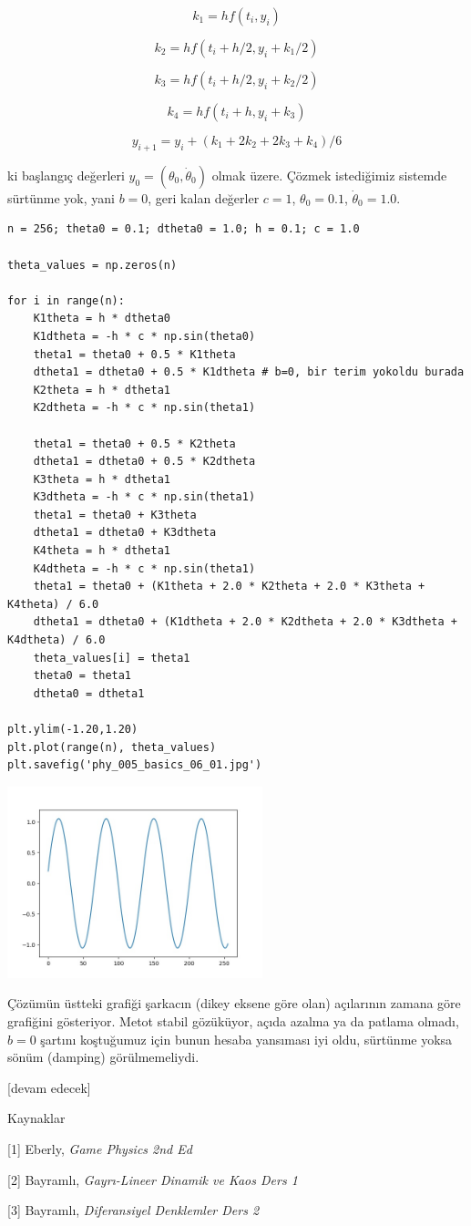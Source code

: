 \documentclass[12pt,fleqn]{article}\usepackage{../../common}
\begin{document}
$$
k_1 = h f(t_i, y_i)
$$

$$
k_2 = h f(t_i + h/2, y_i + k_1/2)
$$

$$
k_3 = h f(t_i + h/2, y_i + k_2/2)
$$

$$
k_4 = h f(t_i + h, y_i + k_3)
$$

$$
y_{i+1} = y_i + (k_1 + 2 k_2 + 2 k_3 + k_4) / 6
$$

ki başlangıç değerleri $y_0 = (\theta_0,\dot{\theta}_0)$ olmak üzere. Çözmek
istediğimiz sistemde sürtünme yok, yani $b=0$, geri kalan değerler $c=1$,
$\theta_0=0.1$, $\dot{\theta}_0 = 1.0$.


\begin{verbatim}
n = 256; theta0 = 0.1; dtheta0 = 1.0; h = 0.1; c = 1.0

theta_values = np.zeros(n)

for i in range(n):
    K1theta = h * dtheta0
    K1dtheta = -h * c * np.sin(theta0)
    theta1 = theta0 + 0.5 * K1theta
    dtheta1 = dtheta0 + 0.5 * K1dtheta # b=0, bir terim yokoldu burada
    K2theta = h * dtheta1
    K2dtheta = -h * c * np.sin(theta1)

    theta1 = theta0 + 0.5 * K2theta
    dtheta1 = dtheta0 + 0.5 * K2dtheta
    K3theta = h * dtheta1
    K3dtheta = -h * c * np.sin(theta1)
    theta1 = theta0 + K3theta
    dtheta1 = dtheta0 + K3dtheta
    K4theta = h * dtheta1
    K4dtheta = -h * c * np.sin(theta1)
    theta1 = theta0 + (K1theta + 2.0 * K2theta + 2.0 * K3theta + K4theta) / 6.0
    dtheta1 = dtheta0 + (K1dtheta + 2.0 * K2dtheta + 2.0 * K3dtheta + K4dtheta) / 6.0
    theta_values[i] = theta1
    theta0 = theta1
    dtheta0 = dtheta1

plt.ylim(-1.20,1.20)
plt.plot(range(n), theta_values)
plt.savefig('phy_005_basics_06_01.jpg')
\end{verbatim}

\includegraphics[width=20em]{phy_005_basics_06_01.jpg}

Çözümün üstteki grafiği şarkacın (dikey eksene göre olan) açılarının zamana göre
grafiğini gösteriyor. Metot stabil gözüküyor, açıda azalma ya da patlama olmadı,
$b=0$ şartını koştuğumuz için bunun hesaba yansıması iyi oldu, sürtünme yoksa
sönüm (damping) görülmemeliydi. 










[devam edecek]

Kaynaklar

[1] Eberly, {\em Game Physics 2nd Ed}

[2] Bayramlı, {\em Gayrı-Lineer Dinamik ve Kaos Ders 1}

[3] Bayramlı, {\em Diferansiyel Denklemler Ders 2}
\end{document}
